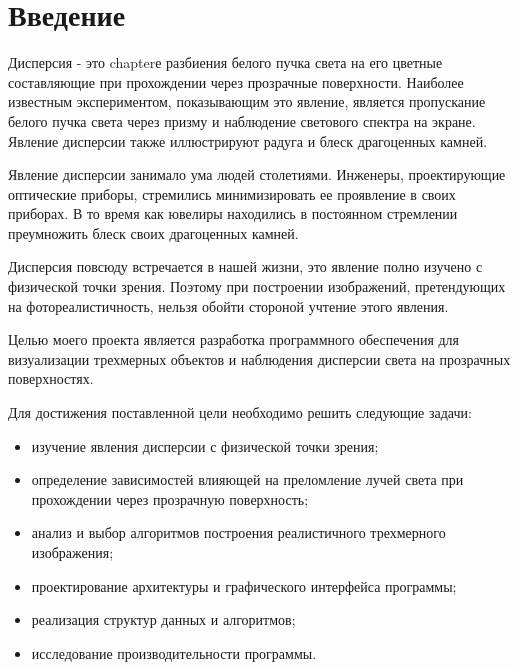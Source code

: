 \section*{Введение}

Дисперсия - это chapterе разбиения белого пучка света на его цветные
составляющие при прохождении через прозрачные поверхности. Наиболее известным
экспериментом, показывающим это явление, является пропускание белого пучка
света через призму и наблюдение светового спектра на экране. Явление дисперсии
также иллюстрируют радуга и блеск драгоценных камней.

Явление дисперсии занимало ума людей столетиями. Инженеры, проектирующие
оптические приборы, стремились минимизировать ее проявление в своих приборах.
В то время как ювелиры находились в постоянном стремлении преумножить блеск
своих драгоценных камней.

Дисперсия повсюду встречается в нашей жизни, это явление полно изучено
с физической точки зрения. Поэтому при построении изображений, претендующих
на фотореалистичность, нельзя обойти стороной учтение этого явления.

Целью моего проекта является разработка программного обеспечения
для визуализации трехмерных объектов и наблюдения дисперсии света
на прозрачных поверхностях.

Для достижения поставленной цели необходимо решить следующие задачи:

\begin{itemize}
    \item изучение явления дисперсии с физической точки зрения;
    \item определение зависимостей влияющей на преломление лучей света
    при прохождении через прозрачную поверхность;
    \item анализ и выбор алгоритмов построения реалистичного трехмерного
    изображения;
    \item проектирование архитектуры и графического интерфейса программы;
    \item реализация структур данных и алгоритмов;
    \item исследование производительности программы.
\end{itemize}

